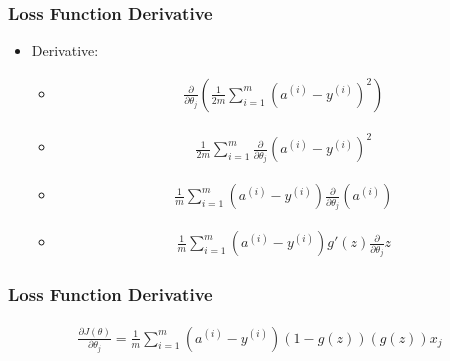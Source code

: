 \documentclass{beamer}
\begin{document}
\begin{frame}
    \frametitle{Loss Function Derivative}
    \begin{itemize}
        \item Derivative: 
        \begin{itemize}[<+->]
            \item 
            \begin{align*}
                \frac{\partial}{\partial \theta_j} \left( \frac{1}{2m} \sum_{i=1}^m (a^{(i)} - y^{(i)})^2 \right)
            \end{align*}
            \item 
            \begin{align*}
                \frac{1}{2m} \sum_{i=1}^m \frac{\partial}{\partial \theta_j} (a^{(i)} - y^{(i)})^2 
            \end{align*}
            \item 
            \begin{align*}
                \frac{1}{m} \sum_{i=1}^m  (a^{(i)} - y^{(i)}) \frac{\partial}{\partial \theta_j} (a^{(i)})
            \end{align*}
            \item 
            \begin{align*}
                \frac{1}{m} \sum_{i=1}^m  (a^{(i)} - y^{(i)}) g'(z) \frac{\partial}{\partial \theta_j} z
            \end{align*}
        \end{itemize}
        
    \end{itemize}
    
\end{frame}

\begin{frame}
    \frametitle{Loss Function Derivative}

    \begin{align*}
        \frac{\partial J(\theta)}{\partial \theta_{j}} = \frac{1}{m} \sum_{i=1}^m (a^{(i)} - y^{(i)})(1-g(z))(g(z))x_j
    \end{align*}

\end{frame}
\end{document}

